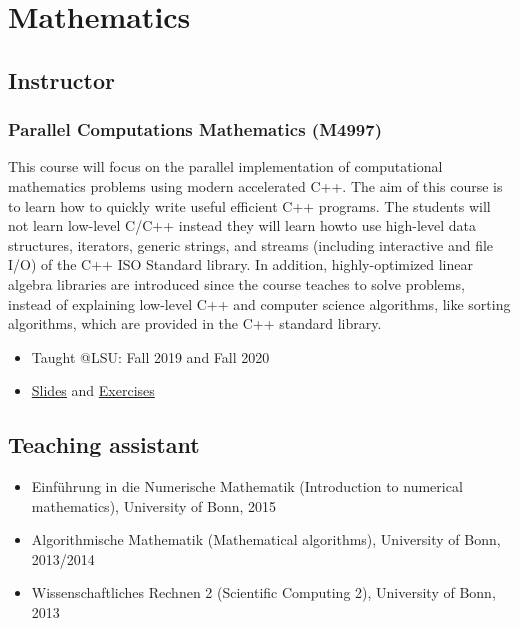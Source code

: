 \documentclass[11pt,a4paper]{article}
\begin{document}
\section*{Mathematics}

\subsection*{Instructor}

\subsubsection*{Parallel Computations Mathematics (M4997)}
This course will focus on the parallel implementation of computational mathematics problems using modern accelerated C++. The aim of this course is to learn how to quickly write useful efficient C++ programs. The students will not learn low-level C/C++ instead they will learn howto use high-level data structures, iterators, generic strings, and streams (including interactive and file I/O) of the C++ ISO Standard library. In addition, highly-optimized linear algebra libraries are introduced since the course teaches to solve problems, instead of explaining low-level C++ and computer science algorithms, like sorting algorithms, which are provided in the C++ standard library.
\begin{itemize}
\item Taught @LSU: Fall 2019 and Fall 2020
\item \href{https://github.com/diehlpkteaching/ParallelComputationMath}{Slides} and \href{https://github.com/diehlpkteaching/ParallelComputationMathExercise}{Exercises}
\end{itemize}

\subsection*{Teaching assistant}
\begin{itemize}
\item Einf\"uhrung in die Numerische Mathematik (Introduction to numerical mathematics), University of Bonn, 2015
\item Algorithmische Mathematik (Mathematical algorithms), University of Bonn, 2013/2014
\item Wissenschaftliches Rechnen 2 (Scientific Computing 2),  University of Bonn, 2013 
\end{itemize}
\end{document}
